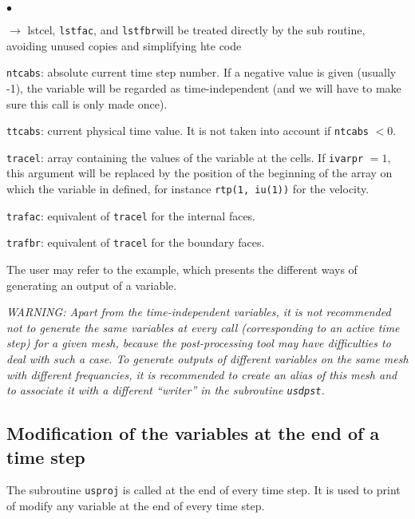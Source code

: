 {{{\begin{list}{$\bullet$}{}
\begin{list}{$\rightarrow$}{}
{lstcel}, \texttt{lstfac}, and \texttt{lstfbr}will be treated directly by
 the sub routine, avoiding unused copies and simplifying hte code
         \end{list}
       \item \texttt{ntcabs}: absolute current time step number. If a
             negative value is given (usually -1), the variable will be
             regarded  as time-independent (and we will have to make sure this
             call is only made once).
       \item \texttt{ttcabs}: current physical time value. It is not taken
             into account if \texttt{ntcabs} $< 0$.
       \item \texttt{tracel}: array containing the values of the
             variable at the cells. If \texttt{ivarpr} $= 1$, this
             argument will be replaced by the position of the beginning
             of the array on which the variable in defined, for instance
             \texttt{rtp(1, iu(1))} for the velocity.
       \item \texttt{trafac}: equivalent of \texttt{tracel} for the
             internal faces.
       \item \texttt{trafbr}: equivalent of \texttt{tracel} for the
             boundary faces.
\end{list}

The user may refer to the example, which presents the different ways of
generating an output of a variable.

{\em WARNING: Apart from the time-independent variables, it is not
recommended not to generate the same variables at every call
(corresponding to an active time step) for a given mesh, because the
post-processing tool may have difficulties to deal with such a case. To
generate outputs of different variables on the same mesh with different
frequancies, it is recommended to create an alias of this mesh and to
associate it with a different ``writer'' in the subroutine \texttt{usdpst}.}

\subsection{Modification of the variables at the end of a time step}

The subroutine \texttt{usproj} is called at the end of every time step. It is used to
print of modify any variable at the end of every time step.

}}}
